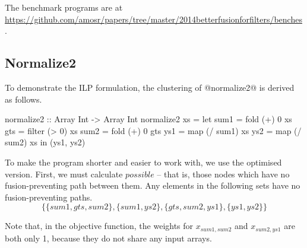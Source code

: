 The benchmark programs are at \url{https://github.com/amosr/papers/tree/master/2014betterfusionforfilters/benches}.


\subsection{Normalize2}
To demonstrate the ILP formulation, the clustering of @normalize2@ is derived as follows.
\begin{code}
 normalize2 :: Array Int -> Array Int
 normalize2 xs
  = let sum1 = fold   (+)  0   xs
        gts  = filter (>   0)  xs
        sum2 = fold   (+)  0   gts
        ys1  = map    (/ sum1) xs
        ys2  = map    (/ sum2) xs
    in (ys1, ys2)
\end{code}

To make the program shorter and easier to work with, we use the optimised version.
First, we must calculate $possible$ -- that is, those nodes which have no fusion-preventing path between them.
Any elements in the following sets have no fusion-preventing paths.
\[ \{ \{sum1, gts, sum2\}
 , \{sum1, ys2\}
 , \{gts, sum2, ys1\}
 , \{ys1, ys2\} \} \]

Note that, in the objective function, the weights for $x_{sum1, sum2}$ and $x_{sum2, ys1}$ are both only 1, because they do not share any input arrays.

